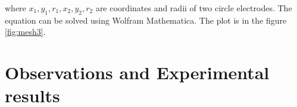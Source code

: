\documentclass{article}
\begin{document}
where $x_1, y_1, r_1, x_2, y_2, r_2$ are coordinates and radii of two circle electrodes. The equation can be solved using Wolfram Mathematica. The plot is in the figure \ref{fig:mesh3}. \par



\section{Observations and Experimental results}

\begin{figure}[htb!]
\begin{center}
\begin{minipage}[h]{0.47\linewidth}
\end{minipage}
\hfill
\begin{minipage}[h]{0.47\linewidth}

\end{minipage}
\end{center}
\end{figure}
\end{document}

